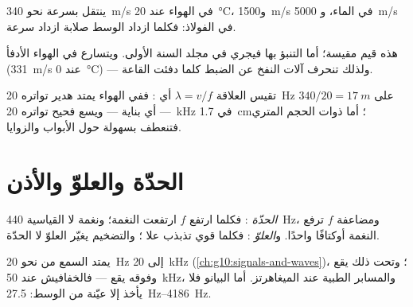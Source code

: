 \begin{proposition}\label{prop:g12:sound-acoustics:speed}
%
ينتقل  بسرعة نحو \qty{340}{m/s} في الهواء عند
\qty{20}{\degreeCelsius}، و\qty{1500}{m/s} في الماء، و
\qty{5000}{m/s} في الفولاذ: فكلما ازداد الوسط صلابة ازداد
سرعة. \admitted
\end{proposition}

\begin{remark}\label{rem:g12:sound-acoustics:temperature}
هذه قيم مقيسة؛ أما التنبؤ بها فيجري في مجلد السنة
الأولى. ويتسارع  في الهواء الأدفأ (\qty{331}{m/s} عند
\qty{0}{\degreeCelsius}) --- ولذلك تنحرف آلات النفخ عن الضبط كلما دفئت القاعة.
\end{remark}

\begin{example}\label{ex:g12:sound-acoustics:wavelengths}
تقيس العلاقة $\lambda = v/f$ أي : ففي الهواء يمتد هدير تواتره \qty{20}{Hz}
على $340/20 = \qty{17}{m}$ --- أي بناية --- ويسع فحيح تواتره
\qty{20}{kHz} في \qty{1.7}{cm}؛ أما ذوات الحجم المتري
فتنعطف بسهولة حول الأبواب والزوايا.
\end{example}

\section{الحدّة والعلوّ والأذن}

\begin{definition}\label{def:g12:sound-acoustics:pitch-loudness}
\emph{الحدّة}  : فكلما ارتفع
$f$ ارتفعت النغمة؛ ونغمة لا القياسية \qty{440}{Hz}، ومضاعفة
$f$ ترفع النغمة أوكتافًا واحدًا. و\emph{العلوّ}
 : فكلما قوي تذبذب 
علا ؛ والتضخيم يغيّر العلوّ لا الحدّة.
\end{definition}

\begin{remark}\label{rem:g12:sound-acoustics:audible}
يمتد السمع من نحو \qty{20}{Hz} إلى \qty{20}{kHz}
(\cref{ch:g10:signals-and-waves})؛ وتحت ذلك يقع ، وفوقه يقع
 --- فالخفافيش عند \qty{50}{kHz}، والمسابر الطبية عند الميغاهرتز. أما
البيانو فلا يأخذ إلا عيّنة من الوسط: \qtyrange{27.5}{4186}{Hz}.
\end{remark}


